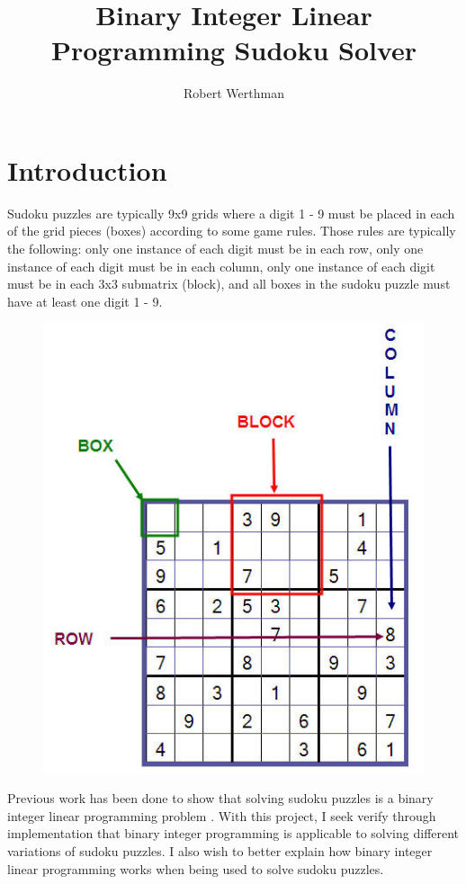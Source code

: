 \documentclass[12pt]{article}
\begin{document}
\title{Binary Integer Linear Programming Sudoku Solver}
\author{Robert Werthman}
\date{}
\maketitle

\section{Introduction}
Sudoku puzzles are typically 9x9 grids where a digit 1 - 9 must be placed in each of the grid pieces (boxes) according to some game rules.  Those rules are typically the following: only one instance of each digit must be in each row, only one instance of each digit must be in each column, only one instance of each digit must be in each 3x3 submatrix (block), and all boxes in the sudoku puzzle must have at least one digit 1 - 9.
\begin{figure}[H]
\includegraphics[scale=.5]{sudoku_with_rules.jpg}
\centering
\end{figure}
Previous work has been done to show that solving sudoku puzzles is a binary integer linear programming problem \cite{sudoku3}. With this project, I seek verify through implementation that binary integer programming is applicable to solving different variations of sudoku puzzles.  I also wish to better explain how binary integer linear programming works when being used to solve sudoku puzzles.
\end{document}
